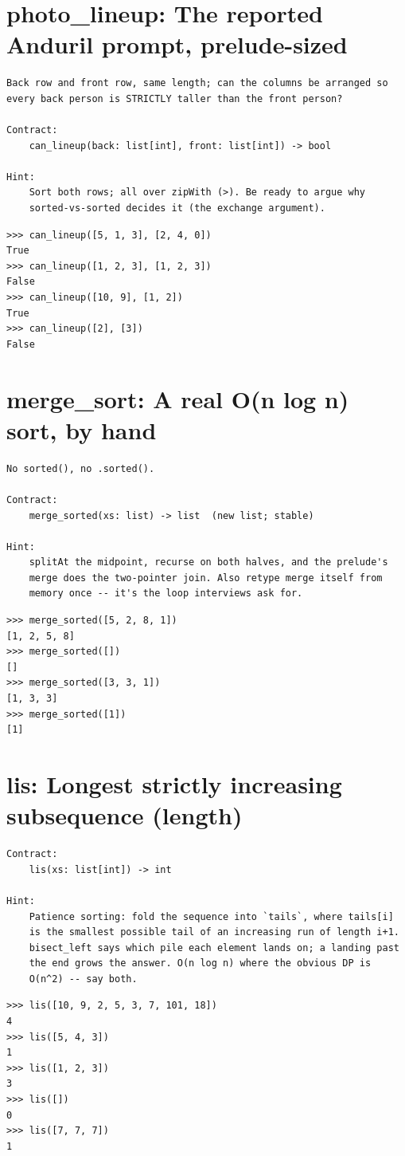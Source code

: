 \documentclass[10pt,letterpaper]{book}
\begin{document}
\section{photo\_lineup: The reported Anduril prompt, prelude-sized}
\begin{lstlisting}[style=ex]
Back row and front row, same length; can the columns be arranged so
every back person is STRICTLY taller than the front person?

Contract:
    can_lineup(back: list[int], front: list[int]) -> bool

Hint:
    Sort both rows; all over zipWith (>). Be ready to argue why
    sorted-vs-sorted decides it (the exchange argument).
\end{lstlisting}
\begin{lstlisting}[style=ex]
>>> can_lineup([5, 1, 3], [2, 4, 0])
True
>>> can_lineup([1, 2, 3], [1, 2, 3])
False
>>> can_lineup([10, 9], [1, 2])
True
>>> can_lineup([2], [3])
False
\end{lstlisting}

\section{merge\_sort: A real O(n log n) sort, by hand}
\begin{lstlisting}[style=ex]
No sorted(), no .sorted().

Contract:
    merge_sorted(xs: list) -> list  (new list; stable)

Hint:
    splitAt the midpoint, recurse on both halves, and the prelude's
    merge does the two-pointer join. Also retype merge itself from
    memory once -- it's the loop interviews ask for.
\end{lstlisting}
\begin{lstlisting}[style=ex]
>>> merge_sorted([5, 2, 8, 1])
[1, 2, 5, 8]
>>> merge_sorted([])
[]
>>> merge_sorted([3, 3, 1])
[1, 3, 3]
>>> merge_sorted([1])
[1]
\end{lstlisting}

\section{lis: Longest strictly increasing subsequence (length)}
\begin{lstlisting}[style=ex]
Contract:
    lis(xs: list[int]) -> int

Hint:
    Patience sorting: fold the sequence into `tails`, where tails[i]
    is the smallest possible tail of an increasing run of length i+1.
    bisect_left says which pile each element lands on; a landing past
    the end grows the answer. O(n log n) where the obvious DP is
    O(n^2) -- say both.
\end{lstlisting}
\begin{lstlisting}[style=ex]
>>> lis([10, 9, 2, 5, 3, 7, 101, 18])
4
>>> lis([5, 4, 3])
1
>>> lis([1, 2, 3])
3
>>> lis([])
0
>>> lis([7, 7, 7])
1
\end{lstlisting}
\end{document}
